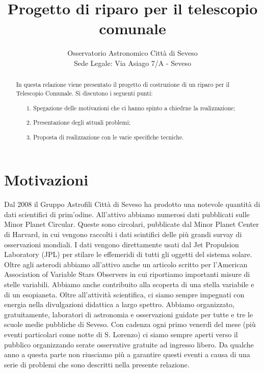 \documentclass[a4paper,12pt]{article}
\begin{document}
\title{\bf \Huge Progetto di riparo per il telescopio comunale\\ }


\author{Osservatorio Astronomico Città di Seveso\\
Sede Legale: Via Asiago 7/A - Seveso
}


\maketitle
\begin{abstract}
In questa relazione viene presentato il progetto di costruzione di un riparo per il Telescopio Comunale. Si discutono i seguenti punti:
	\begin{itemize}
		\item[1.] Spegazione delle motivazioni che ci hanno spinto a chiedrne la realizzazione;
		\item[2.] Presentazione degli attuali problemi;
		\item[3.] Proposta di realizzazione con le varie specifiche tecniche.
	\end{itemize}
\end{abstract}

\section{Motivazioni}
Dal 2008 il Gruppo Astrofili Citt\`a di Seveso ha prodotto una notevole quantit\`a di dati scientifici di prim'odine. All'attivo abbiamo numerosi dati pubblicati sulle Minor Planet Circular. Queste sono circolari, pubblicate dal Minor Planet Center di Harvard, in cui vengono raccolti i dati scintifici delle pi\`u grandi survay di osservazioni mondiali. I dati vengono direttamente usati dal Jet Propulsion Laboratory (JPL) per stilare le effemeridi di tutti gli oggetti del sistema solare. Oltre agli asterodi abbiamo all'attivo anche un articolo scritto per l'American Association of Variable Stars Observers in cui riportiamo importanti misure di stelle variabili. Abbiamo anche contribuito alla scoperta di una stella variabile e di un esopianeta. Oltre all'attivit\`a scientifica, ci siamo sempre impegnati con energia nella divulgazioni didattica a largo spettro. Abbiamo organizzato, gratuitamente, laboratori di astronomia e osservazioni guidate per tutte e tre le scuole medie pubbliche di Seveso. Con cadenza ogni primo venerd\`i del mese (pi\`u eventi particolari come notte di S. Lorenzo) ci siamo sempre aperti verso il pubblico organizzando serate osservative gratuite ad ingresso libero. Da qualche anno a questa parte non riusciamo pi\`u a garantire questi eventi a causa di una serie di problemi che sono descritti nella presente relazione.
\end{document}

